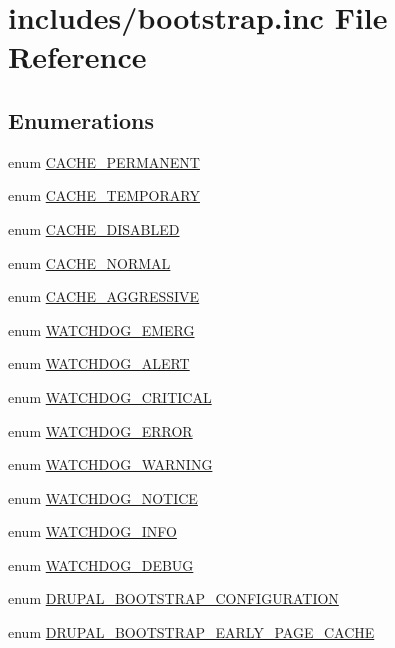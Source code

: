 \hypertarget{bootstrap_8inc}{
\section{includes/bootstrap.inc File Reference}
\label{bootstrap_8inc}
}
\subsection*{Enumerations}
\begin{CompactItemize}
\item 
enum \hyperlink{bootstrap_8inc_d987330fff5fa7c75800762ddedf300c}{CACHE\_\-PERMANENT} 
\item 
enum \hyperlink{bootstrap_8inc_1f2558e91eb9f33d14168bb8dfd99690}{CACHE\_\-TEMPORARY} 
\item 
enum \hyperlink{bootstrap_8inc_14fac00bc515c0931ce0a5b0193e00c0}{CACHE\_\-DISABLED} 
\item 
enum \hyperlink{bootstrap_8inc_068072633e0369efaf063d814bdacf9a}{CACHE\_\-NORMAL} 
\item 
enum \hyperlink{bootstrap_8inc_c48cd3663e21507376bbbe62d3436223}{CACHE\_\-AGGRESSIVE} 
\item 
enum \hyperlink{bootstrap_8inc_878c4376d15611196e4a5f50e8287084}{WATCHDOG\_\-EMERG} 
\item 
enum \hyperlink{bootstrap_8inc_9fdd40d55b14109f09f091f401f237c0}{WATCHDOG\_\-ALERT} 
\item 
enum \hyperlink{bootstrap_8inc_b4129b98c8480bea3cbcd62083ae81e3}{WATCHDOG\_\-CRITICAL} 
\item 
enum \hyperlink{bootstrap_8inc_174c9df2936096e11986fcf184d48576}{WATCHDOG\_\-ERROR} 
\item 
enum \hyperlink{bootstrap_8inc_5361f835e10b39b553ee73c1b9414bf1}{WATCHDOG\_\-WARNING} 
\item 
enum \hyperlink{bootstrap_8inc_757a33416683e8c44636a8799f60b477}{WATCHDOG\_\-NOTICE} 
\item 
enum \hyperlink{bootstrap_8inc_9629ff808fd20ce4abb297db5976af4d}{WATCHDOG\_\-INFO} 
\item 
enum \hyperlink{bootstrap_8inc_f672cd38d5654f8a4a12e32d9b9e749d}{WATCHDOG\_\-DEBUG} 
\item 
enum \hyperlink{bootstrap_8inc_d71394314c3ad7cef54b5f566e3ec177}{DRUPAL\_\-BOOTSTRAP\_\-CONFIGURATION} 
\item 
enum \hyperlink{bootstrap_8inc_2a31f7dd5f742243b66f16c9d3237407}{DRUPAL\_\-BOOTSTRAP\_\-EARLY\_\-PAGE\_\-CACHE} 

\end{CompactItemize}
